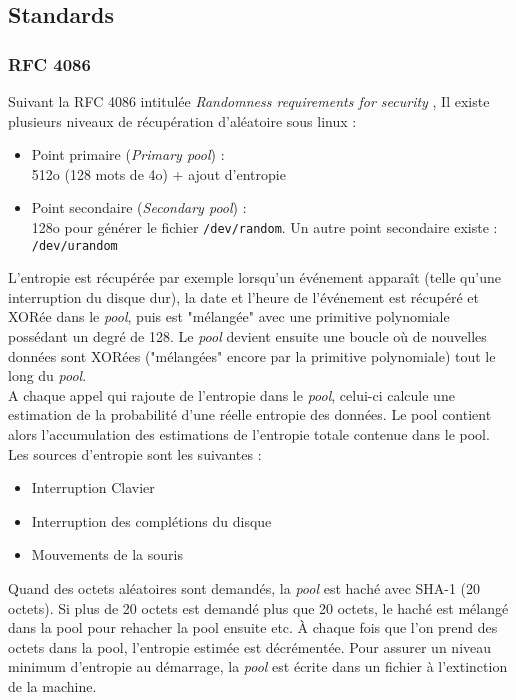 \subsection{Standards}
\subsubsection{RFC 4086}
Suivant la RFC 4086 \nocite{rfc4086} intitulée \textit{Randomness requirements for security} \nocite{rfc4086}, 
Il existe plusieurs niveaux de récupération d'aléatoire sous linux  :
\begin{itemize}
\item Point primaire (\textit{Primary pool}) :\\
512o (128 mots de 4o) + ajout d’entropie
\item Point secondaire (\textit{Secondary pool}) :\\
128o pour générer le fichier \texttt{/dev/random}. Un autre point secondaire existe : \texttt{/dev/urandom}\\
\end{itemize}

L'entropie est récupérée par exemple lorsqu'un événement apparaît (telle qu'une interruption du disque dur), la date et l'heure de l'événement est récupéré et XORée dans le \textit{pool}, puis  est "mélangée" avec une primitive polynomiale possédant un degré de 128. Le \textit{pool} devient ensuite une boucle où de nouvelles données sont XORées ("mélangées" encore par la primitive polynomiale) tout le long du \textit{pool}.\\


A chaque appel qui rajoute de l'entropie dans le \textit{pool}, celui-ci calcule une estimation de la probabilité d'une réelle entropie des données. Le pool contient alors l'accumulation des estimations de l'entropie totale contenue dans le pool.\\


Les sources d'entropie sont les suivantes :
\begin{itemize}
\item Interruption Clavier  
\item Interruption des complétions du disque
\item Mouvements de la souris
\end{itemize}

Quand des octets aléatoires sont demandés, la \textit{pool} est haché avec SHA-1 (20 octets). Si plus de 20 octets  est demandé plus que 20 octets, le haché est mélangé dans la pool pour rehacher la pool ensuite etc. À chaque fois que l’on prend des octets dans la pool, l’entropie estimée est décrémentée. Pour assurer un niveau minimum d'entropie au démarrage, la \textit{pool} est écrite dans un fichier à l'extinction de la machine.\\

